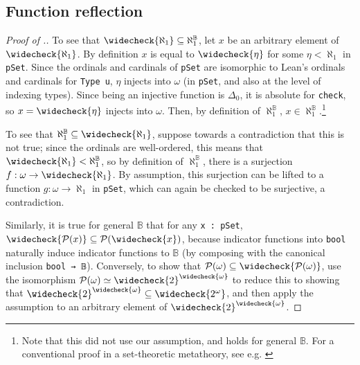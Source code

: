 \documentclass[sigplan,10pt,review, anonymous]{acmart}
\newcommand{\lil}{\lstinline}
\theoremstyle{definition}
\begin{document}

\subsection{Function reflection} \label{subsect:function-reflection}

\begin{proof}[Proof of .]

  To see that \(\widecheck{\aleph_1} \subseteq \aleph_1^{\mathbb{B}}\), let \(x\) be an arbitrary element of \(\widecheck{\aleph_1}\).
  By definition \(x\) is equal to \(\widecheck{\eta}\) for some \(\eta < \aleph_1\) in \lil{pSet}.
  Since the ordinals and cardinals of \lil{pSet} are isomorphic to Lean's ordinals and cardinals for \lil{Type u}, \(\eta\) injects into \(\omega\) (in \lil{pSet}, and also at the level of indexing types).
  Since being an injective function is \(\Delta_0\), it is absolute for \lil{check}, so \(x = \widecheck{\eta}\) injects into \(\omega\).
  Then, by definition of \(\aleph_1^{\mathbb{B}}\), \(x \in \aleph_1^{\mathbb{B}}\).\footnote{Note that this did not use our assumption, and holds for general \(\mathbb{B}\).
  For a conventional proof in a set-theoretic metatheory, see e.g. \cite{bell2011set}}

  To see that \(\aleph_1^{\mathbb{B}} \subseteq \widecheck{\aleph_1}\), suppose towards a contradiction that this is not true; since the ordinals are well-ordered,
  this means that \(\widecheck{\aleph_1} < \aleph_1^{\mathbb{B}}\), so by definition of \(\aleph_1^{\mathbb{B}}\), there is a surjection \(f : \omega \to \widecheck{\aleph_1}\).
  By assumption, this surjection can be lifted to a function \(g : \omega \to \aleph_1\) in \lil{pSet}, which can again be checked to be surjective, a contradiction.

  Similarly, it is true for general \(\mathbb{B}\) that for any \lil{x : pSet}, \(\widecheck{\mathcal{P}(x)} \subseteq \mathcal{P}(\widecheck{x})\),
  because indicator functions into \lil{bool} naturally induce indicator functions to \(\mathbb{B}\) (by composing with the canonical inclusion \lil{bool → 𝔹}).
  Conversely, to show that \(\mathcal{P}(\omega) \subseteq \widecheck{\mathcal{P}(\omega)}\), use the isomorphism \(\mathcal{P}(\omega) \simeq \widecheck{2}^{\widecheck{\omega}}\) to reduce this to showing that \(\widecheck{2}^{\widecheck{\omega}} \subseteq \widecheck{2^{\omega}}\),
  and then apply the assumption to an arbitrary element of \(\widecheck{2}^{\widecheck{\omega}}\).
\end{proof}
\end{document}
